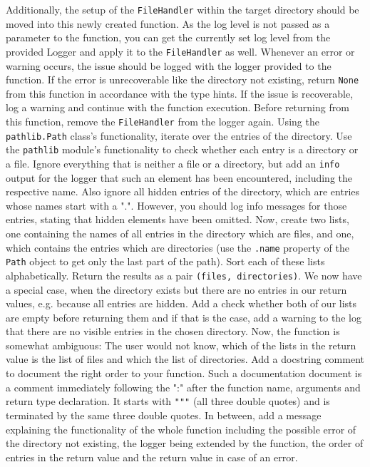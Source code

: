\documentclass[]{erlangen-problemset}
\begin{document}
\begin{problem}[title={Type checking}]
Additionally, the setup of the \texttt{FileHandler} within the target directory should be moved into this newly created function.
As the log level is not passed as a parameter to the function, you can get the currently set log level from the provided Logger and apply it to the \texttt{FileHandler} as well. 
Whenever an error or warning occurs, the issue should be logged with the logger provided to the function. 
If the error is unrecoverable like the directory not existing, return \texttt{None} from this function in accordance with the type hints. 
If the issue is recoverable, log a warning and continue with the function execution.
Before returning from this function, remove the \texttt{FileHandler} from the logger again.
\Question Using the \texttt{pathlib.Path} class's functionality, iterate over the entries of the directory. 
Use the \texttt{pathlib} module's functionality to check whether each entry is a directory or a file. 
Ignore everything that is neither a file or a directory, but add an \texttt{info} output for the logger that such an element has been encountered, including the respective name. 
\Question Also ignore all hidden entries of the directory, which are entries whose names start with a ".". 
However, you should log info messages for those entries, stating that hidden elements have been omitted.
\Question Now, create two lists, one containing the names of all entries in the directory which are files, and one, which contains the entries which are directories (use the \texttt{.name} property of the \texttt{Path} object to get only the last part of the path).
Sort each of these lists alphabetically. 
Return the results as a pair \texttt{(files, directories)}.
\Question We now have a special case, when the directory exists but there are no entries in our return values, e.g. because all entries are hidden. 
Add a check whether both of our lists are empty before returning them and if that is the case, add a warning to the log that there are no visible entries in the chosen directory.
\Question Now, the function is somewhat ambiguous: 
The user would not know, which of the lists in the return value is the list of files and which the list of directories. 
Add a docstring comment to document the right order to your function. 
Such a documentation document is a comment immediately following the ":" after the function name, arguments and return type declaration. 
It starts with \texttt{"""} (all three double quotes) and is terminated by the same three double quotes. 
In between, add a message explaining the functionality of the whole function including the possible error of the directory not existing, the logger being extended by the function, the order of entries in the return value and the return value in case of an error.

\end{problem}
\end{document}

